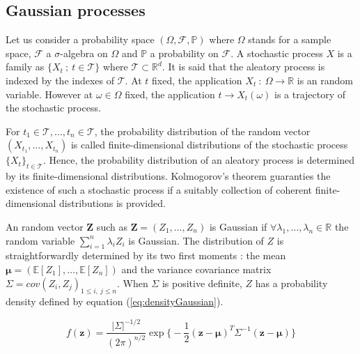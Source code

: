 \documentclass[soumission]{jsfds}
\edef\hc{\string: }
\begin{document}
\begin{appendices}
	\renewcommand{\chaptername}{Appendix}
	\section{Gaussian processes \label{ap:GaussianProcesses}}
	Let us consider a probability space $(\Omega,\mathcal{F},\mathbb{P})$ where $\Omega$ stands for a sample space, $\mathcal{F}$ a $\sigma$-algebra on $\Omega$ and $\mathbb{P}$ a probability on $\mathcal{F}$. A stochastic process $X$ is a family as $\{ X_t\ ;\ t\in\mathcal{T}\}$ where $\mathcal{T}\subset\mathbb{R}^d$. It is said that the aleatory process is indexed by the indexes of $\mathcal{T}$. At $t$ fixed, the application $X_t \ : \ \Omega \rightarrow \mathbb{R}$ is an random variable. However at $\omega \in \Omega$ fixed, the application $ t \rightarrow X_t(\omega)$ is a trajectory of the stochastic process.\newline


For $t_1 \in \mathcal{T},\dots, t_n\in\mathcal{T}$, the probability distribution of the random vector $(X_{t_1},\dots,X_{t_n})$ is called finite-dimensional distributions of the stochastic process $\{X_t\}_{t\in\mathcal{T}}$. Hence, the probability distribution of an aleatory process is determined by its finite-dimensional distributions. Kolmogorov's theorem guaranties the existence of such a stochastic process if a suitably collection of coherent finite-dimensional distributions is provided.\newline

An random vector $\boldsymbol{Z}$ such as $\boldsymbol{Z}=(Z_1,\dots,Z_n)$ is Gaussian if $\forall \lambda_1,\dots,\lambda_n \in \mathbb{R}$ the random variable $\sum_{i=1}^n\lambda_iZ_i$ is Gaussian. The distribution of $Z$ is straightforwardly determined by its two first moments \hc the mean $\boldsymbol{\mu}=(\mathbb{E}[Z_1],\dots,\mathbb{E}[Z_n])$ and the variance covariance matrix $\Sigma = cov(Z_i,Z_j)_{1\leq i,\ j\leq n}$. When $\Sigma$ is positive definite, $Z$ has a probability density defined by equation (\ref{eq:densityGaussian}). \newline

\begin{equation}
f(\bm{z})=\frac{|\Sigma|^{-1/2}}{(2\pi)^{n/2}}\exp \Big\{-\frac{1}{2}(\boldsymbol{z}-\boldsymbol{\mu})^T\Sigma^{-1}(\boldsymbol{z}-\boldsymbol{\mu}) \Big\}
\label{eq:densityGaussian}
\end{equation}


\end{appendices}
\end{document}

